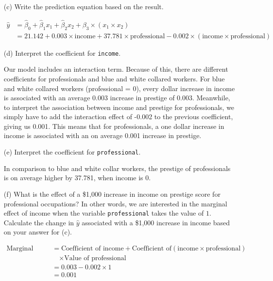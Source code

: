 \documentclass[12pt,letterpaper]{article}
\begin{document}
\begin{enumerate}
	\item [(c)]
	Write the prediction equation based on the result.
	
		\begin{align*}
	\hat{y}&= \widehat{\beta}_0+\widehat{\beta}_1x_1+\widehat{\beta}_2x_2+{\beta}_3\times(x_1\times x_2) \\
	& = 21.142 + 0.003 \times \text{{income}} + 37.781 \times \text{{professional}}-0.002\times( \text{{income}}\times \text{{professional}})
	\end{align*}
	
\newpage
	\item [(d)]
	Interpret the coefficient for \texttt{income}.
	
	Our model includes an interaction term. Because of this, there are different coefficients for professionals and blue and white collared workers. For blue and white collared workers (professional = 0), every dollar increase in income is associated with an average 0.003 increase in prestige of 0.003. Meanwhile, to interpret the association between income and prestige for professionals, we simply have to add the interaction effect of -0.002 to the previous coefficient, giving us 0.001. This means that for professionals, a one dollar increase in income is associated with an on average 0.001 increase in prestige.
	
	\item [(e)]
	Interpret the coefficient for \texttt{professional}.
	
	In comparison to blue and white collar workers, the prestige of professionals is on average higher by 37.781, when income is 0.
	
	\item [(f)]
	What is the effect of a \$1,000 increase in income on prestige score for professional occupations? In other words, we are interested in the marginal effect of income when the variable  \texttt{professional} takes the value of $1$. Calculate the change in $\hat{y}$ associated with a \$1,000 increase in income based on your answer for (c).
		
		\begin{align*}
		\text{Marginal Effect} &= 	\text{Coefficient of income} + \text{Coefficient of} (\text{income} \times \text{professional})\\
		&\quad \times \text{Value of professional}\\
		&= 0.003 - 0.002 \times 1 \\
		&= 0.001
		\end{align*}
	

\end{enumerate}
\end{document}

